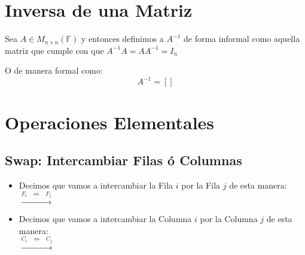 \documentclass[12pt]{report}                                    %
\DeclareMathOperator \Space {\quad}                             %
\DeclareMathOperator \MiniSpace {\;}                            %
\newcommand \lequal {\MiniSpace \Leftrightarrow \MiniSpace}     %
\newcommand \longto {\longrightarrow}                           %
\newcommand{\Brackets}[1]{\left[ #1 \right]}                    %
\begin{document}
        \clearpage
        \section{Inversa de una Matriz}

            Sea $A \in M_{n \times n}(\mathbb{F})$ y entonces definimos a $A^{-1}$ 
            de forma informal como aquella matriz que cumple con que $A^{-1}A = AA^{-1} = I_{n}$

            O de manera formal como:
            \begin{equation}
                A^{-1} = \Brackets{}
            \end{equation}






        \clearpage
        \section{Operaciones Elementales}

            \subsection{Swap: Intercambiar Filas ó Columnas}

                \begin{itemize}
                    \item
                        Decimos que vamos a intercambiar la Fila $i$ por la Fila $j$ de
                        esta manera:\\
                        $\overset{F_i \lequal F_j}{\longto}$

                    \item
                        Decimos que vamos a intercambiar la Columna $i$ por la Columna $j$ de
                        esta manera:\\
                        $\overset{C_i \lequal C_j}{\longto}$
                \end{itemize}
\end{document}
